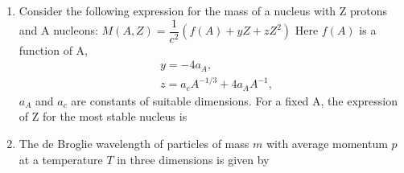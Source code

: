 \documentclass[14pt, a4paper]{extarticle}
\begin{document}
\begin{enumerate}[label=\textbf{Q. \arabic*}, start=21]
\item Consider the following expression for the mass of a nucleus with Z protons and A nucleons:
$M(A,Z) = \dfrac{1}{c^2}(f(A) + yZ + zZ^2)$
Here $f(A)$ is a function of A,
\begin{align*}
& y = -4a_A, \\
& z = a_c A^{-1/3} + 4a_A A^{-1},
\end{align*}
$a_A$ and $a_c$ are constants of suitable dimensions. For a fixed A, the expression of Z for the most stable nucleus is
\begin{enumerate}
\end{enumerate}

\item The de Broglie wavelength of particles of mass $m$ with average momentum $p$ at a temperature $T$ in three dimensions is given by
\begin{enumerate}
\end{enumerate}




\end{enumerate}
\end{document}
